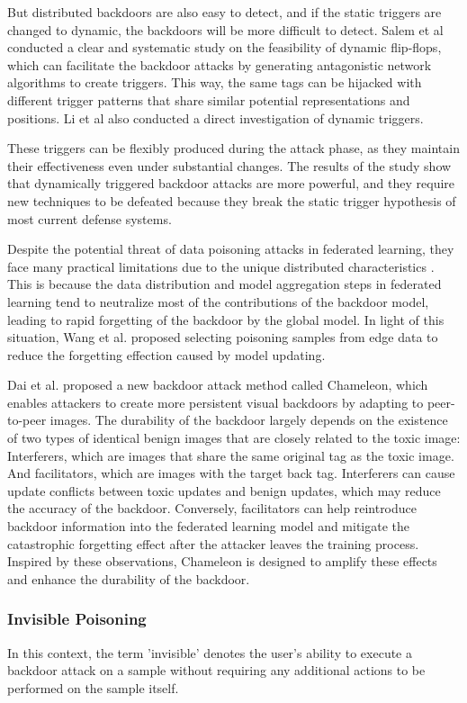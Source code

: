 \documentclass[conference]{IEEEtran}
\begin{document}
But distributed backdoors are also easy to detect, and if the static triggers are changed to dynamic, 
the backdoors will be more difficult to detect.
Salem et al \cite{b60} conducted a
clear and systematic study on the feasibility of dynamic flip-flops,
which can facilitate the backdoor attacks by generating antagonistic
network algorithms to create triggers. This way, the same tags can be
hijacked with different trigger patterns that share similar potential
representations and positions. Li et al \cite{b61} also conducted a direct
investigation of dynamic triggers.

These triggers can be flexibly produced
during the attack phase, as they maintain their effectiveness even
under substantial changes. The results of the study show that dynamically
triggered backdoor attacks are more powerful, and they require new techniques
to be defeated because they break the static trigger hypothesis of most current
defense systems.

Despite the potential threat of data poisoning attacks in federated learning,
they face many practical limitations due to the unique distributed characteristics \cite{b251}.
This is because the data distribution and model aggregation steps in federated learning tend to neutralize
most of the contributions of the backdoor model, leading to rapid forgetting of the backdoor by the global model.
In light of this situation, Wang et al.\cite{b251} proposed selecting poisoning samples from edge data to reduce the
forgetting effection caused by model updating.

Dai et al.\cite{b64} proposed a new backdoor attack method called Chameleon,
which enables attackers to create more persistent visual backdoors by adapting
to peer-to-peer images. The durability of the backdoor largely depends
on the existence of two types of identical benign images that are closely
related to the toxic image: Interferers, which are images that share
the same original tag as the toxic image. And facilitators, which are
images with the target back tag. Interferers can cause update conflicts
between toxic updates and benign updates, which may reduce the accuracy of
the backdoor. Conversely, facilitators can help reintroduce backdoor
information into the federated learning model and mitigate the catastrophic
forgetting effect after the attacker leaves the training process. Inspired by
these observations, Chameleon is designed to amplify these effects and enhance
the durability of the backdoor.

\subsubsection{Invisible Poisoning}
In this context, the term 'invisible' denotes the user's ability to execute
a backdoor attack on a sample without requiring any additional actions to
be performed on the sample itself.
\end{document}

